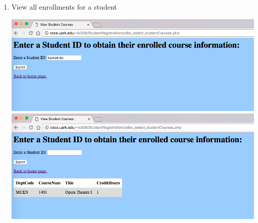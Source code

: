 \documentclass{article}      %
\begin{document}
\begin{enumerate}
\item View all enrollments for a student

	\includegraphics[width=\textwidth]{ViewStudentCoursesBefore}
	\includegraphics[width=\textwidth]{ViewStudentCoursesAfter}
\end{enumerate}
\end{document}
